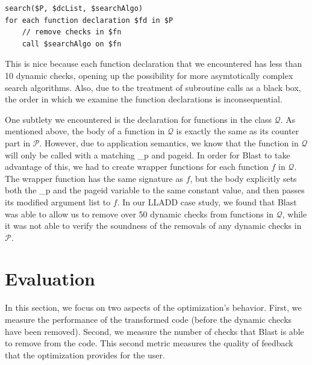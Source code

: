\documentclass[10pt,letterpaper,twocolumn,english]{article}
\newcommand{\fP}{{$\mathcal P$}\xspace}
\newcommand{\fQ}{{$\mathcal Q$}\xspace}
\begin{document}
\begin{verbatim}
search($P, $dcList, $searchAlgo)
for each function declaration $fd in $P
    // remove checks in $fn
    call $searchAlgo on $fn 
\end{verbatim}

This is nice because each function declaration that we encountered has
less than 10 dynamic checks, opening up the possibility for more
asymtotically complex search algorithms.  Also, due to the treatment of
subroutine calls as a black box, the order in which we examine the
function declarations is inconsequential.

One subtlety we encountered is the declaration for functions in the
class \fQ.  As mentioned above, the body of a function in \fQ is exactly
the same as its counter part in \fP.  However, due to application
semantics, we know that the function in \fQ will only be called with a
matching \_p and pageid.  In order for Blast to take advantage of this,
we had to create wrapper functions for each function $f$ in \fQ.  The
wrapper function has the same signature as $f$, but the body explicitly
sets both the \_p and the pageid variable to the same constant value,
and then passes its modified argument list to $f$.  In our LLADD case
study, we found that Blast was able to allow us to remove over 50
dynamic checks from functions in \fQ, while it was not able to verify
the soundness of the removals of any dynamic checks in \fP.


\section{Evaluation}

In this section, we focus on two aspects of the optimization's
behavior.  First, we measure the performance of the transformed code
(before the dynamic checks have been removed).  Second, we measure the
number of checks that Blast is able to remove from the code.  This
second metric measures the quality of feedback that the optimization
provides for the user.
\end{document}
